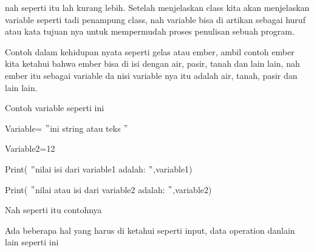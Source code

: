 \vspace{14pt}
\noindent 
{\fontsize{14pt}{14pt}\selectfont 
	nah seperti itu lah kurang lebih.
	{\fontsize{14pt}{14pt}\selectfont
	Setelah menjelaskan class kita akan menjelaskan variable seperti tadi penampung class, nah variable bisa di artikan sebagai huruf atau kata tujuan nya untuk mempermudah proses penulisan sebuah program. \\} \par
\noindent 
{\fontsize{14pt}{14pt}\selectfont Contoh dalam kehidupan nyata seperti gelas atau ember, ambil contoh ember kita ketahui bahwa ember bisa di isi dengan air, pasir, tanah dan lain lain, nah ember itu sebagai variable da nisi variable nya itu adalah air, tanah, pasir dan lain lain. \\} \par
\vspace{14pt}
\noindent 
{\fontsize{14pt}{14pt}\selectfont Contoh variable seperti ini \\} \par
\noindent 
{\fontsize{14pt}{14pt}\selectfont Variable=  $ " $ini string atau teks $ " $ \\} \par
\noindent 
{\fontsize{14pt}{14pt}\selectfont Variable2=12 \\} \par
\vspace{14pt}
\noindent 
{\fontsize{14pt}{14pt}\selectfont Print( $ " $nilai isi dari variable1 adalah: $ " $,variable1) \\} \par
\noindent 
{\fontsize{14pt}{14pt}\selectfont Print( $ " $nilai atau isi dari variable2 adalah: $ " $,variable2) \\} \par
\noindent 
{\fontsize{14pt}{14pt}\selectfont Nah seperti itu contohnya \\} \par
\vspace{14pt}
\noindent 
{\fontsize{14pt}{14pt}\selectfont Ada beberapa hal yang harus di ketahui seperti input, data operation danlain lain seperti ini \\} \par

}
